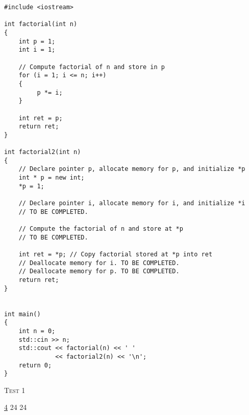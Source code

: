 \begin{Verbatim}[commandchars=\~\!\@,frame=single]
#include <iostream>

int factorial(int n)
{
    int p = 1;
    int i = 1;

    // Compute factorial of n and store in p
    for (i = 1; i <= n; i++)
    {
         p *= i;
    }

    int ret = p; 
    return ret; 
}

int factorial2(int n)
{
    // Declare pointer p, allocate memory for p, and initialize *p
    int * p = new int;
    *p = 1;

    // Declare pointer i, allocate memory for i, and initialize *i
    // TO BE COMPLETED.

    // Compute the factorial of n and store at *p
    // TO BE COMPLETED.

    int ret = *p; // Copy factorial stored at *p into ret
    // Deallocate memory for i. TO BE COMPLETED.
    // Deallocate memory for p. TO BE COMPLETED.
    return ret;
}


int main()
{
    int n = 0;
    std::cin >> n;
    std::cout << factorial(n) << ' ' 
              << factorial2(n) << '\n';
    return 0;
}
\end{Verbatim}



\textsc{Test 1}
\begin{console}[commandchars=\\\{\}]
\underline{4}
24 24
\end{console}
